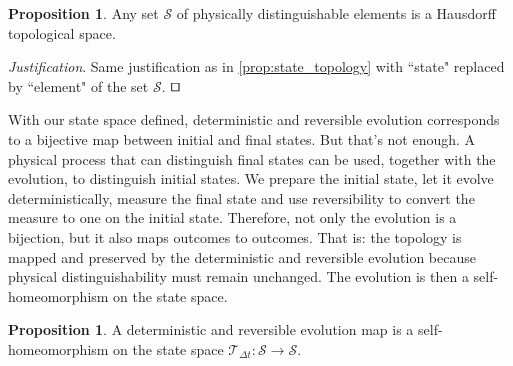 \documentclass[smallextended]{svjour3}
\numberwithin{equation}{section}
\newenvironment{justification}{\emph{Justification}.}{\hfill\(\qed\)}
\theoremstyle{definition}
\newtheorem{prop}[equation]{Proposition}
\newenvironment{justification}{\emph{Justification}.}{\qed}
\begin{document}
\begin{prop}\label{prop:topology}
	Any set $\mathcal{S}$ of physically distinguishable elements is a Hausdorff topological space.
\end{prop}

\begin{justification}
	Same justification as in \ref{prop:state_topology} with ``state" replaced by ``element" of the set $\mathcal{S}$.
\end{justification}

With our state space defined, deterministic and reversible evolution corresponds to a bijective map between initial and final states. But that's not enough. A physical process that can distinguish final states can be used, together with the evolution, to distinguish initial states. We prepare the initial state, let it evolve deterministically, measure the final state and use reversibility to convert the measure to one on the initial state. Therefore, not only the evolution is a bijection, but it also maps outcomes to outcomes. That is: the topology is mapped and preserved by the deterministic and reversible evolution because physical distinguishability must remain unchanged. The evolution is then a self-homeomorphism on the state space.

\begin{prop}\label{prop:homeomorphism}
A deterministic and reversible evolution map is a self-homeomorphism on the state space $\mathcal{T}_{\Delta t}:\mathcal{S} \rightarrow \mathcal{S}$.
\end{prop}
\end{document}
